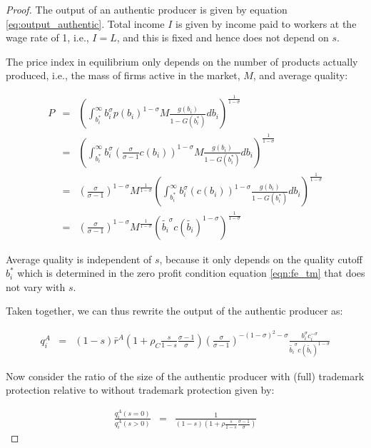 \documentclass[12pt]{article}
\begin{document}
\begin{proof}

The output of an authentic producer is given by equation \eqref{eq:output_authentic}. Total income $I$ is given by income paid to workers at the wage rate of 1, i.e., $I = L$, and this is fixed and hence does not depend on $s$.

The price index in equilibrium only depends on the number of products  actually produced, i.e., the mass of firms active in the market, $M$, and average quality:

\begin{eqnarray*}
P & = & \left( \int_{b_i^{\ast}}^{\infty} b_i^{\sigma} p(b_i)^{1-\sigma} M \frac{g(b_i)}{1 - G(b_i^{\ast})} d b_i \right)^{\frac{1}{1-\sigma}} \\
& = & \left( \int_{b_i^{\ast}}^{\infty} b_i^{\sigma} \left(\frac{\sigma}{\sigma - 1} c(b_i) \right)^{1-\sigma} M \frac{g(b_i)}{1 - G(b_i^{\ast})} d b_i \right)^{\frac{1}{1-\sigma}} \\
& = & \left(\frac{\sigma}{\sigma - 1}  \right)^{1-\sigma} M^{\frac{1}{1-\sigma}} \left( \int_{b_i^{\ast}}^{\infty} b_i^{\sigma} \left( c(b_i) \right)^{1-\sigma}  \frac{g(b_i)}{1 - G(b_i^{\ast})} d b_i \right)^{\frac{1}{1-\sigma}} \\
& = & \left(\frac{\sigma}{\sigma - 1}  \right)^{1-\sigma} M^{\frac{1}{1-\sigma}} \left( \tilde{b_i}^{\sigma}c(\tilde{b_i})^{1-\sigma} \right)^{\frac{1}{1-\sigma}}
\end{eqnarray*}

Average quality is independent of $s$, because it only depends on the quality cutoff $b_i^{\ast}$ which is determined in the  zero profit condition equation  \eqref{eqn:fe_tm} that does not vary with $s$.

Taken together, we can thus rewrite the output of the authentic producer as:


\begin{eqnarray*}
   q_i^A&=& (1-s) \bar{r}^A \left( 1+\rho_C \frac{s}{1-s}  \frac{\sigma - 1}{\sigma}   \right)  \left(\frac{\sigma}{\sigma - 1}  \right)^{-(1-\sigma)^2-\sigma}  \frac{b_i^{\sigma} c_i^{-\sigma}}{\tilde{b_i}^{\sigma}c(\tilde{b_i})^{1-\sigma}} 
\end{eqnarray*}



Now consider the ratio of the size of the authentic producer with (full) trademark protection relative to without trademark protection given by:

\begin{eqnarray} \label{eq:output_authentic}
\frac{q_i^A (s=0)}{q_i^A (s>0)} &=& \frac{1}{(1-s) \left( 1+\rho \frac{s}{1-s}  \frac{\sigma - 1}{\sigma}   \right) } 
\end{eqnarray}


\end{proof}
\end{document}
